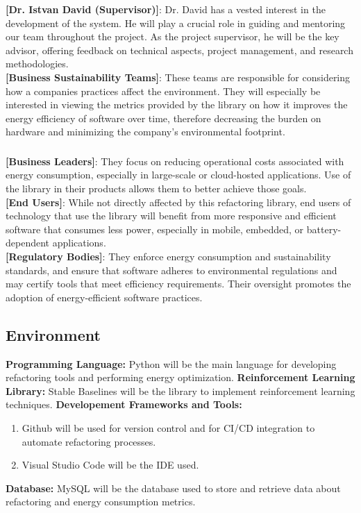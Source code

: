 \documentclass{article}
\begin{document}
\noindent
\textbf{[Dr. Istvan David (Supervisor)]}: Dr. David has a vested interest in the development of the system. He will play a crucial role in guiding and mentoring our team throughout the project. As the project supervisor, he will be the key advisor, offering feedback on technical aspects, project management, and research methodologies. \\

\noindent
\textbf{[Business Sustainability Teams]}: These teams are responsible for considering how a companies practices affect the environment. They will especially be interested in viewing the metrics provided by the library on how it improves the energy efficiency of software over time, therefore decreasing the burden on hardware and minimizing the company's environmental footprint.

\subsubsection*{\color{blue}{Indirect Stakeholders}}
\textbf{[Business Leaders]}: They focus on reducing operational costs associated with energy consumption, especially in large-scale or cloud-hosted applications. Use of the library in their products allows them to better achieve those goals. \\

\noindent
\textbf{[End Users]}: While not directly affected by this refactoring library, end users of technology that use the library will benefit from more responsive and efficient software that consumes less power, especially in mobile, embedded, or battery-dependent applications. \\

\noindent
\textbf{[Regulatory Bodies]}: They enforce energy consumption and sustainability standards, and ensure that software adheres to environmental regulations and may certify tools that meet efficiency requirements. Their oversight promotes the adoption of energy-efficient software practices.

\subsection{Environment}
\textbf{Programming Language:} Python will be the main language for developing refactoring tools and performing energy optimization.
\textbf{Reinforcement Learning Library: } Stable Baselines will be the library to implement reinforcement learning techniques.
\textbf{Developement Frameworks and Tools: } 
\begin{enumerate}
    \item Github will be used for version control and for CI/CD integration to automate refactoring processes.
    \item Visual Studio Code will be the IDE used.
\end{enumerate} 
\textbf{Database: } MySQL will be the database used to store and retrieve data about refactoring and energy consumption metrics.
\end{document}
